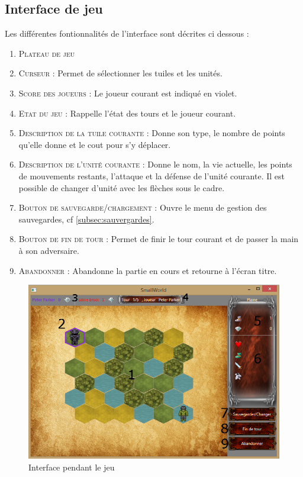 	\subsection{Interface de jeu}
		\label{sec:interfaceIG}
		Les différentes fontionnalités de l'interface sont décrites ci dessous :
		\begin{enumerate}
			\item \textsc{Plateau de jeu} 
			\item \textsc{Curseur} : Permet de sélectionner les tuiles et les unités.
			\item \textsc{Score des joueurs} : Le joueur courant est indiqué en violet.
			\item \textsc{Etat du jeu} : Rappelle l'état des tours et le joueur courant.
			\item \textsc{Description de la tuile courante} : Donne son type, le nombre de points qu'elle donne et le cout pour s'y déplacer.
			\item \textsc{Description de l'unité courante} : Donne le nom, la vie actuelle, les points de mouvements restants, l'attaque et la défense de l'unité courante.
						Il est possible de changer d'unité avec les flèches sous le cadre.
			\item \textsc{Bouton de sauvegarde/chargement} : Ouvre le menu de gestion des sauvegardes, cf \ref{subsec:sauvergardes}.
			\item \textsc{Bouton de fin de tour} : Permet de finir le tour courant et de passer la main à son adversaire.
			\item \textsc{Abandonner} : Abandonne la partie en cours et retourne à l'écran titre.
		\end{enumerate}
		
		\begin{figure}[h!]
			\caption{Interface pendant le jeu}
			\label{fig:interfaceIG}
			\centering
			\includegraphics[width=\textwidth]{res/in_game_annot}
		\end{figure}
		
